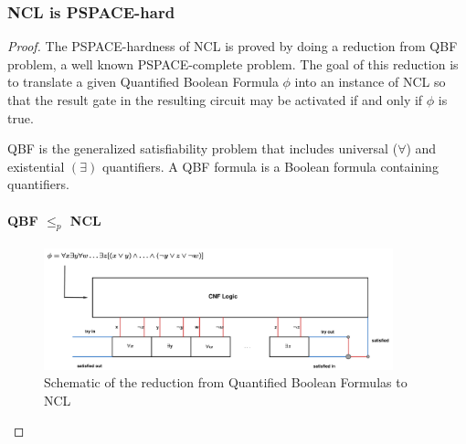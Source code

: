 \subsubsection{NCL is PSPACE-hard}
\begin{proof}
The PSPACE-hardness of NCL is proved by doing a reduction from QBF problem, a well known PSPACE-complete problem. The goal of this reduction is to translate a given Quantified Boolean Formula $\phi$ into an instance of NCL so that the result gate in the resulting circuit may be activated if and only if $\phi$ is true. 

\begin{defn}
QBF is the generalized satisfiability problem that includes universal ($\forall$) and existential $(\exists)$ quantifiers. A QBF formula is a Boolean formula containing quantifiers. 
\end{defn}

\paragraph{QBF $\leq_p$ NCL} \hfill \break

\begin{figure}[H]
\centering
\includegraphics[width=0.9\textwidth]{res/NCL.pdf}
\caption{Schematic of the reduction from Quantified Boolean Formulas to NCL}
\label{fig:circle}
\end{figure}


\end{proof}
